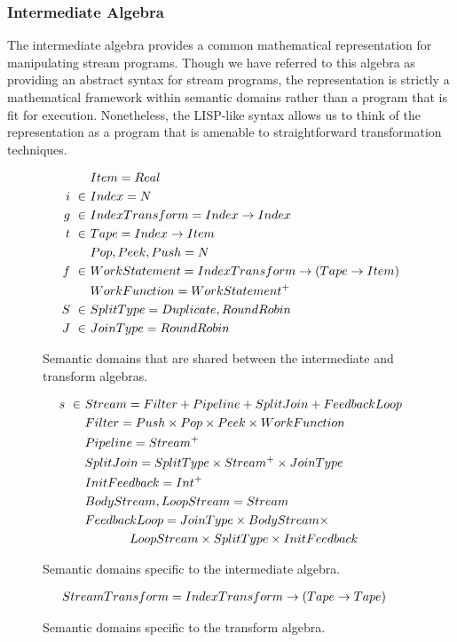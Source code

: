 \subsubsection{Intermediate Algebra}
\label{sec:intalgebra}

The intermediate algebra provides a common mathematical representation
for manipulating stream programs.  Though we have referred to this
algebra as providing an abstract syntax for stream programs, the
representation is strictly a mathematical framework within semantic
domains rather than a program that is fit for execution.  Nonetheless,
the LISP-like syntax allows us to think of the representation as a
program that is amenable to straightforward transformation techniques.

\begin{figure}
\begin{align*}
&Item = Real \\
i~\in~&Index = N \\
g~\in~&IndexTransform = Index \rightarrow Index \\
t~\in~&Tape = Index \rightarrow Item \\
&Pop, Peek, Push = N \\ 
f~\in~&WorkStatement = IndexTransform \rightarrow (Tape \rightarrow Item) \\ 
&WorkFunction = WorkStatement^{+} \\
S~\in~&SplitType = {Duplicate, RoundRobin} \\ 
J~\in~&JoinType = {RoundRobin}
\end{align*}
\vspace{-18pt}
\caption{Semantic domains that are shared between the intermediate and
  transform algebras.
\protect\label{fig:shareddom}}
\vspace{-6pt}
\begin{align*}
s~\in~&Stream = Filter + Pipeline + SplitJoin + FeedbackLoop \\
&Filter = Push \times Pop \times Peek \times WorkFunction \\
&Pipeline = Stream^{+} \\
&SplitJoin = SplitType \times Stream^{+} \times JoinType \\
&InitFeedback = Int^{+} \\
&BodyStream, LoopStream = Stream \\
&FeedbackLoop = JoinType \times BodyStream \times \\
& \hspace{0.5in} LoopStream \times SplitType \times InitFeedback
\end{align*}
\vspace{-18pt}
\caption{Semantic domains specific to the intermediate algebra.
\protect\label{fig:interdom}}
\vspace{-6pt}
\begin{align*}
&StreamTransform = IndexTransform \rightarrow (Tape \rightarrow Tape)
\end{align*}
\caption{Semantic domains specific to the transform algebra.
\protect\label{fig:transformdom}}
\end{figure}

